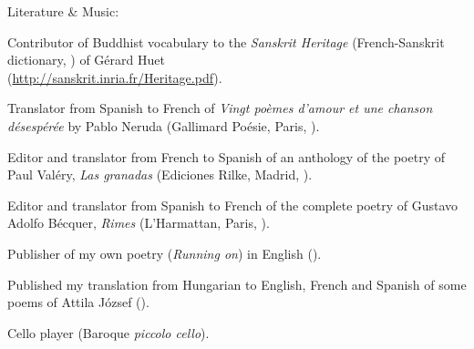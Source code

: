 \documentclass[a4paper,11pt]{article}
\begin{document}
\noindent Literature \& Music:
\begin{itemize*}

  \item Contributor of Buddhist vocabulary to the \emph{Sanskrit
  Heritage} (French-Sanskrit dictionary, ) of
    Gérard Huet\\ (\url{http://sanskrit.inria.fr/Heritage.pdf}).

  \item Translator from Spanish to French of \textit{Vingt poèmes
    d'amour et une chanson désespérée} by Pablo Neruda (Gallimard
    Poésie, Paris, ).

  \item Editor and translator from French to Spanish of an anthology
    of the poetry of Paul Valéry, \emph{Las granadas} (Ediciones
    Rilke, Madrid, ).

  \item Editor and translator from Spanish to French of the complete
    poetry of Gustavo Adolfo B\'ecquer, \textit{Rimes} (L'Harmattan,
    Paris, ).

  \item Publisher of my own poetry (\textit{Running on}) in English
    ().

  \item Published my translation from Hungarian to English, French and
    Spanish of some poems of Attila József ().

  \item Cello player (Baroque \emph{piccolo cello}).

\end{itemize*}



\nocite{*}
\end{document}
